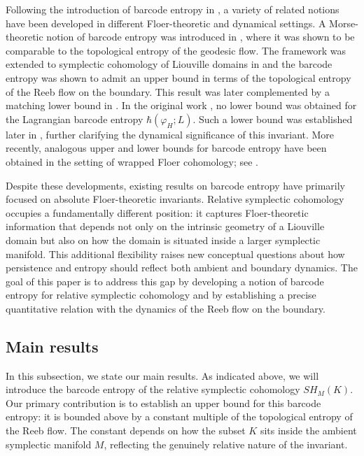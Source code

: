 \documentclass[12pt]{amsart}
\theoremstyle{definition}
\begin{document}
\vspace{0.1cm}
Following the introduction of barcode entropy in \cite{cgg}, a variety of related notions have been developed in different Floer-theoretic and dynamical settings. A Morse-theoretic notion of barcode entropy was introduced in \cite{ggm}, where it was shown to be comparable to the topological entropy of the geodesic flow. The framework was extended to symplectic cohomology of Liouville domains in \cite{fls} and the barcode entropy was shown to admit an upper bound in terms of the topological entropy of the Reeb flow on the boundary. This result was later complemented by a matching lower bound in \cite{cggm}. In the original work \cite{cgg}, no lower bound was obtained for the Lagrangian barcode entropy $\hbar(\varphi_H;L)$. Such a lower bound was established later in \cite{m}, further clarifying the dynamical significance of this invariant. More recently, analogous upper and lower bounds for barcode entropy have been obtained in the setting of wrapped Floer cohomology; see \cite{f,f2}.


\vspace{0.2 cm}

Despite these developments, existing results on barcode entropy have primarily focused on absolute Floer-theoretic invariants. Relative symplectic cohomology occupies a fundamentally different position: it captures Floer-theoretic information that depends not only on the intrinsic geometry of a Liouville domain but also on how the domain is situated inside a larger symplectic manifold. This additional flexibility raises new conceptual questions about how persistence and entropy should reflect both ambient and boundary dynamics. The goal of this paper is to address this gap by developing a notion of barcode entropy for relative symplectic cohomology and by establishing a precise quantitative relation with the dynamics of the Reeb flow on the boundary.

\subsection{Main results}
In this subsection, we state our main results. As indicated above, we will introduce the barcode entropy of the relative symplectic cohomology $SH_M(K)$. Our primary contribution is to establish an upper bound for this barcode entropy: it is bounded above by a constant multiple of the topological entropy of the Reeb flow. The constant depends on how the subset $K$ sits inside the ambient symplectic manifold $M$, reflecting the genuinely relative nature of the invariant.  
\end{document}
